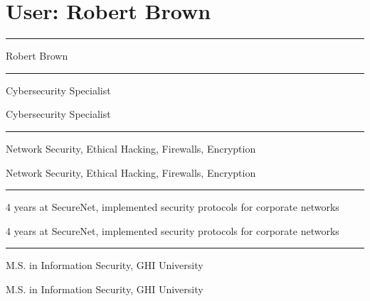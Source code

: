 \documentclass[10pt]{article}
\begin{document}
\section*{User: Robert Brown}
\noindent\hrule\par
\settowidth{\marginparwidth}{Robert Brown}
\addtolength{\marginparwidth}{0pt}
\setlength{\marginparsep}{16pt}

\begin{flushleft}
 Robert Brown \\
\end{flushleft}
\noindent\rule{1.5ex}{3pt}\par
\settowidth{\marginsparwidth}{\itshape Position: } Cybersecurity Specialist \\
\addtolength{\marginsparwidth}{0pt}
\begin{flushright}
 Cybersecurity Specialist \\
\end{flushright}
\noindent\rule{1.5ex}{3pt}\par
\settowidth{\marginsparwidth}{\itshape Skills: } Network Security, Ethical Hacking, Firewalls, Encryption \\
\addtolength{\marginsparwidth}{0pt}
\begin{flushright}
 Network Security, Ethical Hacking, Firewalls, Encryption \\
\end{flushright}
\noindent\rule{1.5ex}{3pt}\par
\settowidth{\marginsparwidth}{\itshape Experience: } 4 years at SecureNet, implemented security protocols for corporate networks \\
\addtolength{\marginsparwidth}{0pt}
\begin{flushright}
 4 years at SecureNet, implemented security protocols for corporate networks \\
\end{flushright}
\noindent\rule{1.5ex}{3pt}\par
\settowidth{\marginsparwidth}{\itshape Education: } M.S. in Information Security, GHI University \\
\addtolength{\marginsparwidth}{0pt}
\begin{flushright}
 M.S. in Information Security, GHI University \\
\end{flushright}
\end{document}
